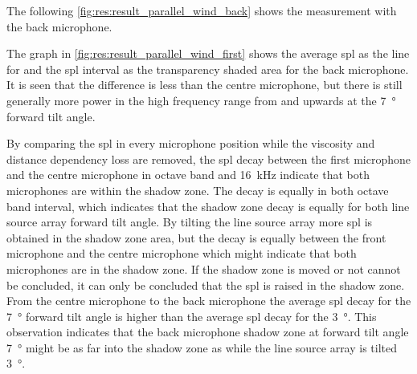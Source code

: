 The following \autoref{fig:res:result_parallel_wind_back} shows the measurement with the back microphone.
 
 
  
   
The graph in \autoref{fig:res:result_parallel_wind_first} shows the average \gls{spl} as the line for and the \gls{spl} interval as the transparency shaded area for the back microphone. It is seen that the difference is less than the centre microphone, but there is still generally more power in the high frequency range from  and upwards at the \SI{7}{\degree} forward tilt angle.   


By comparing the \gls{spl} in every microphone position while the viscosity and distance dependency loss are removed, the \gls{spl} decay between the first microphone and the centre microphone in octave band  and \SI{16}{\kilo\hertz} indicate that both microphones are within the shadow zone. The decay is equally in both octave band interval, which indicates that the shadow zone decay is equally for both line source array forward tilt angle. By tilting the line source array more \gls{spl} is obtained in the shadow zone area, but the decay is equally between the front microphone and the centre microphone which might indicate that both microphones are in the shadow zone. If the shadow zone is moved or not cannot be concluded, it can only be concluded that the \gls{spl} is raised in the shadow zone. 
From the centre microphone to the back microphone the average \gls{spl} decay for the \SI{7}{\degree} forward tilt angle is higher than the average \gls{spl} decay for the \SI{3}{\degree}. This observation indicates that the back microphone shadow zone at forward tilt angle \SI{7}{\degree} might be as far into the shadow zone as while the line source array is tilted \SI{3}{\degree}.